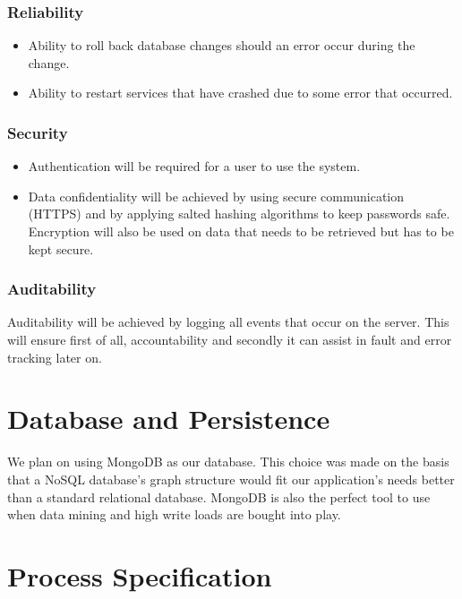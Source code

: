 \documentclass[hidelinks,english]{article}
\begin{document}
			\subsubsection{Reliability}
				\begin{itemize}
					\item Ability to roll back database changes should an error occur during the change.
					\item Ability to restart services that have crashed due to some error that occurred.
				\end{itemize}
							
			\subsubsection{Security}
				\begin{itemize}
					\item Authentication will be required for a user to use the system.
					\item Data confidentiality will be achieved by using secure communication (HTTPS) and by applying salted hashing algorithms to keep passwords safe. Encryption will also be used on data that needs to be retrieved but has to be kept secure.
				\end{itemize}
											
			\subsubsection{Auditability}
				Auditability will be achieved by logging all events that occur on the server. This will ensure first of all, accountability and secondly it can assist in fault and error tracking later on.
		
	\section{Database and Persistence}
		We plan on using MongoDB as our database. This choice was made on the basis that a NoSQL database's graph structure would fit our application's needs better than a standard relational database. MongoDB is also the perfect tool to use when data mining and high write loads are bought into play.
	
	\section{Process Specification}
\end{document}
